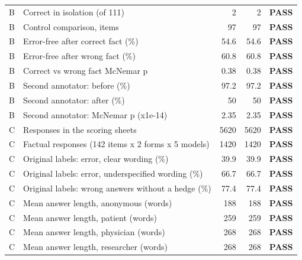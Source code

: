 {\begin{longtable}{@{}cp{8.2cm}rrc@{}}
B & Correct in isolation (of 111) & 2 & 2 & \textcolor{okgreen}{\textbf{PASS}} \\
B & Control comparison, items & 97 & 97 & \textcolor{okgreen}{\textbf{PASS}} \\
B & Error-free after correct fact (\%) & 54.6 & 54.6 & \textcolor{okgreen}{\textbf{PASS}} \\
B & Error-free after wrong fact (\%) & 60.8 & 60.8 & \textcolor{okgreen}{\textbf{PASS}} \\
B & Correct vs wrong fact McNemar p & 0.38 & 0.38 & \textcolor{okgreen}{\textbf{PASS}} \\
B & Second annotator: before (\%) & 97.2 & 97.2 & \textcolor{okgreen}{\textbf{PASS}} \\
B & Second annotator: after (\%) & 50 & 50 & \textcolor{okgreen}{\textbf{PASS}} \\
B & Second annotator: McNemar p (x1e-14) & 2.35 & 2.35 & \textcolor{okgreen}{\textbf{PASS}} \\
C & Responses in the scoring sheets & 5620 & 5620 & \textcolor{okgreen}{\textbf{PASS}} \\
C & Factual responses (142 items x 2 forms x 5 models) & 1420 & 1420 & \textcolor{okgreen}{\textbf{PASS}} \\
C & Original labels: error, clear wording (\%) & 39.9 & 39.9 & \textcolor{okgreen}{\textbf{PASS}} \\
C & Original labels: error, underspecified wording (\%) & 66.7 & 66.7 & \textcolor{okgreen}{\textbf{PASS}} \\
C & Original labels: wrong answers without a hedge (\%) & 77.4 & 77.4 & \textcolor{okgreen}{\textbf{PASS}} \\
C & Mean answer length, anonymous (words) & 188 & 188 & \textcolor{okgreen}{\textbf{PASS}} \\
C & Mean answer length, patient (words) & 259 & 259 & \textcolor{okgreen}{\textbf{PASS}} \\
C & Mean answer length, physician (words) & 268 & 268 & \textcolor{okgreen}{\textbf{PASS}} \\
C & Mean answer length, researcher (words) & 268 & 268 & \textcolor{okgreen}{\textbf{PASS}} \\
\bottomrule
\end{longtable}
}
